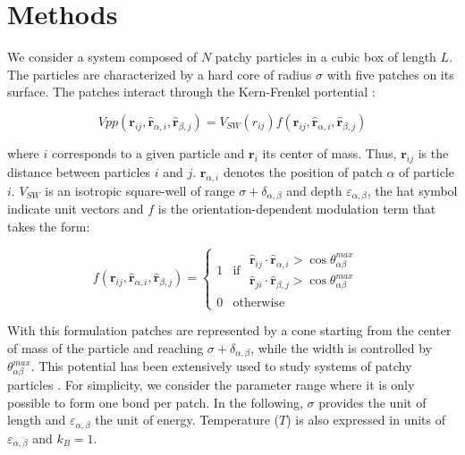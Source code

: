 \documentclass[a4paper, amsfonts, amssymb, amsmath, reprint, showkeys, nofootinbib, oneside]{revtex4-1}
\begin{document}
\section{Methods}

We consider a system composed of $N$ patchy particles in a cubic box of length $L$. The particles are characterized by a hard core of radius $\sigma$ with five patches on its surface. The patches interact through the Kern-Frenkel portential \cite{Kern2003}:

\begin{equation}
Vpp(\boldsymbol{r}_{ij}, \boldsymbol{\hat{r}}_{\alpha, i}, \boldsymbol{\hat{r}}_{\beta, j})=V_{SW}(r_{ij})f(\boldsymbol{r}_{ij}, \boldsymbol{\hat{r}}_{\alpha, i}, \boldsymbol{\hat{r}}_{\beta, j})
\end{equation}

where $i$ corresponds to a given particle and $\boldsymbol{r}_{i}$ its center of mass. Thus, $\boldsymbol{r}_{ij}$ is the distance between particles $i$ and $j$. $\boldsymbol{r}_{\alpha, i}$ denotes the position of patch $\alpha$ of particle $i$. $V_{SW}$ is an isotropic square-well of range $\sigma + \delta_{\alpha,\beta}$ and depth $\varepsilon_{\alpha,\beta}$, the hat symbol indicate unit vectors and $f$ is the orientation-dependent modulation term that takes the form:

\begin{equation}
\label{KF}
f(\boldsymbol{r}_{ij}, \boldsymbol{\hat{r}}_{\alpha, i}, \boldsymbol{\hat{r}}_{\beta, j})=
    \begin{cases}
        1 & \text{if $\begin{aligned}
            \text{$\boldsymbol{\hat{r}}_{ij} \cdot \boldsymbol{\hat{r}}_{\alpha, i} > \cos     \theta^{max}_{\alpha \beta}$} \\
            \text{$\boldsymbol{\hat{r}}_{ji} \cdot \boldsymbol{\hat{r}}_{\beta, j} > \cos     \theta^{max}_{\alpha \beta}$}
        \end{aligned}$ } \\
        0 & \text{otherwise}
    \end{cases}
\end{equation}

With this formulation patches are represented by a cone starting from the center of mass of the particle and reaching $\sigma + \delta_{\alpha,\beta}$, while the width is controlled by $\theta^{max}_{\alpha \beta}$. This potential has been extensively used to study systems of patchy particles \cite{Rovigatti2018}. For simplicity, we consider the parameter range where it is only possible to form one bond per patch. In the following, $\sigma$ provides the unit of length and $\varepsilon_{\alpha, \beta}$ the unit of energy. Temperature ($T$) is also expressed in units of $\varepsilon_{\alpha, \beta}$ and $k_B=1$.
\end{document}
